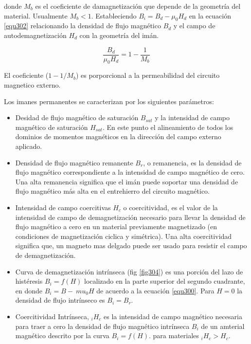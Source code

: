 \documentclass[12pt]{book}
\theoremstyle{definition}
\theoremstyle{remark}
\theoremstyle{plain}
\begin{document}
donde $M_b$ es el coeficiente de damagnetización que depende de la geometría del material. Usualmente $M_b <1$. Estableciendo $B_i = B_d - \mu _0 H_d$ en la ecuación \ref{equ302} relacionando la densidad de flujo magnético $B_d$ y el campo de  autodemagnetización $H_d$ con la geometría del imán.

\begin{equation}
\label{equ303}
\frac{B_d}{\mu_0 H_d} = 1 - \frac{1}{M_b}
\end{equation}

El coeficiente ($1-1/M_b$) es porporcional a la permeabilidad del circuito magnetico externo.

Los imanes permanentes se caracterizan por los siguientes parámetros:

\begin{itemize}
\item Desidad de flujo magnético de saturación $B_{sat}$ y la intensidad de campo magnético de saturación $H_{sat}$. En este punto el alineamiento de todos los dominios de momentos magnéticos en la dirección del campo externo aplicado.

\item Densidad de flujo magnético remanente $B_r$, o remanencia, es la densidad de flujo magnético correspondiente a la intensidad de campo magnético de cero. Una alta remanencia significa que el imán puede soportar una densidad de flujo magnético más alta en el entrehierro del circuito magnético.

\item Intensidad de campo coercitivas $H_c$ o coercitividad, es el valor de la intensidad de  campo de demagnetización necesario para llevar la densidad de flujo magnético a cero en un material previamente magnetizado (en condiciones de magnetización ciclica y simétrica). Una alta coercitividad significa que, un magneto mas delgado puede ser usado para resistir el campo de demagnetización.

\item Curva de demagnetización intrínseca (fig \ref{fig304}) es una porción del lazo de histéresis  $B_i = f(H)$ localizado en la parte superior del segundo cuadrante, en donde $B_i=B-\ mu_0 H$ de acuerdo a la ecuación \ref{equ300}. Para $H=0$ la densidad de flujo intrínseco es $B_i=B_r$.

\item Coercitividad Intrínseca, ${}_i H_c$ es la intensidad de campo magnético necesaria para traer a cero la densidad de flujo magnético intrínseca $B_i$ de un amterial magnético descrito por la curva $B_i=f(H)$. para materiales ${}_{i}H_{c}> H_c$.


\end{itemize}
\end{document}
